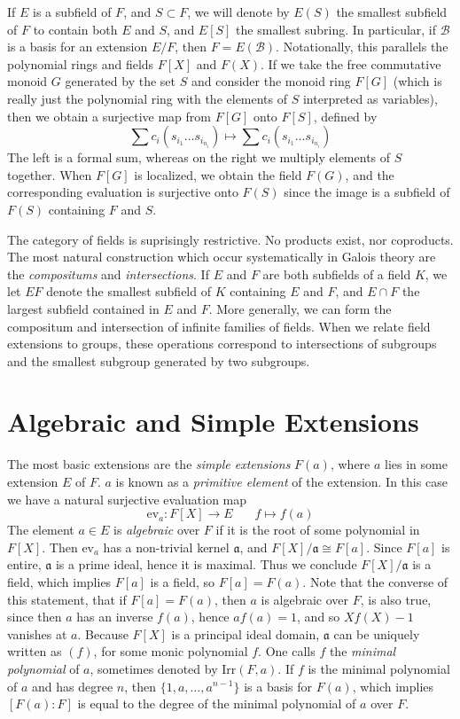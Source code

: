 If $E$ is a subfield of $F$, and $S \subset F$, we will denote by $E(S)$ the smallest subfield of $F$ to contain both $E$ and $S$, and $E[S]$ the smallest subring. In particular, if $\mathcal{B}$ is a basis for an extension $E/F$, then $F = E(\mathcal{B})$. Notationally, this parallels the polynomial rings and fields $F[X]$ and $F(X)$. If we take the free commutative monoid $G$ generated by the set $S$ and consider the monoid ring $F[G]$ (which is really just the polynomial ring with the elements of $S$ interpreted as variables), then we obtain a surjective map from $F[G]$ onto $F[S]$, defined by
%
\[ \sum c_i (s_{i_1} \dots s_{i_{n_i}}) \mapsto \sum c_i (s_{i_1} \dots s_{i_{n_i}}) \]
%
The left is a formal sum, whereas on the right we multiply elements of $S$ together. When $F[G]$ is localized, we obtain the field $F(G)$, and the corresponding evaluation is surjective onto $F(S)$ since the image is a subfield of $F(S)$ containing $F$ and $S$.

The category of fields is suprisingly restrictive. No products exist, nor coproducts. The most natural construction which occur systematically in Galois theory are the \emph{compositums} and \emph{intersections}. If $E$ and $F$ are both subfields of a field $K$, we let $EF$ denote the smallest subfield of $K$ containing $E$ and $F$, and $E \cap F$ the largest subfield contained in $E$ and $F$. More generally, we can form the compositum and intersection of infinite families of fields. When we relate field extensions to groups, these operations correspond to intersections of subgroups and the smallest subgroup generated by two subgroups.

\section{Algebraic and Simple Extensions}

The most basic extensions are the {\it simple extensions} $F(a)$, where $a$ lies in some extension $E$ of $F$. $a$ is known as a {\it primitive element} of the extension. In this case we have a natural surjective evaluation map
%
\[ \text{ev}_a: F[X] \to E\ \ \ \ \ \ \ \ f \mapsto f(a) \]
%
The element $a \in E$ is {\it algebraic} over $F$ if it is the root of some polynomial in $F[X]$. Then $\text{ev}_a$ has a non-trivial kernel $\mathfrak{a}$, and $F[X]/\mathfrak{a} \cong F[a]$. Since $F[a]$ is entire, $\mathfrak{a}$ is a prime ideal, hence it is maximal. Thus we conclude $F[X]/\mathfrak{a}$ is a field, which implies $F[a]$ is a field, so $F[a] = F(a)$. Note that the converse of this statement, that if $F[a] = F(a)$, then $a$ is algebraic over $F$, is also true, since then $a$ has an inverse $f(a)$, hence $af(a) = 1$, and so $Xf(X) - 1$ vanishes at $a$. Because $F[X]$ is a principal ideal domain, $\mathfrak{a}$ can be uniquely written as $(f)$, for some monic polynomial $f$. One calls $f$ the {\it minimal polynomial} of $a$, sometimes denoted by $\text{Irr}(F,a)$. If $f$ is the minimal polynomial of $a$ and has degree $n$, then $\{ 1, a, \dots, a^{n-1} \}$ is a basis for $F(a)$, which implies $[F(a): F]$ is equal to the degree of the minimal polynomial of $a$ over $F$.

